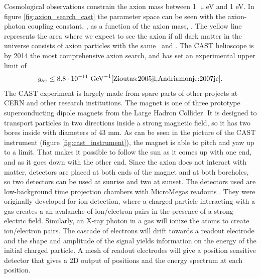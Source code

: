 Cosmological observations constrain the axion mass between 1 $\upmu$eV and 1 eV. In figure \ref{fig:axion_search_cast} the parameter space can be seen with the axion-photon coupling constant, \gay, as a function of the axion mass, \maxion. The yellow line represents the area where we expect to see the axion if all dark matter in the universe consists of axion particles with the same \maxion\ and \gay. The CAST helioscope is by 2014 the most comprehensive axion search, and has set an experimental upper limit of
\begin{eqnarray}
g_{\textrm{a$\gamma$}} \leq 8.8 \cdot 10^{-11} \textrm{ GeV}^{-1}\cite{Zioutas:2005jl,Andriamonje:2007jc}.
\end{eqnarray}
The CAST experiment is largely made from spare parts of other projects at CERN and other research institutions. The magnet is one of three prototype superconducting dipole magnets from the Large Hadron Collider. It is designed to transport particles in two directions inside a strong magnetic field, so it has two bores inside with diameters of 43 mm. As can be seen in the picture of the CAST instrument (figure \ref{fig:cast_instrument}), the magnet is able to pitch and yaw up to a limit. That makes it possible to follow the sun as it comes up with one end, and as it goes down with the other end. Since the axion does not interact with matter, detectors are placed at both ends of the magnet and at both boreholes, so two detectors can be used at sunrise and two at sunset. The detectors used are low-background time projection chambers with MicroMegas readouts \cite{Giomataris:1996eo,Giomataris:2006fy,Andriamonje:2010jh}. They were originally developed for ion detection, where a charged particle interacting with a gas creates a an avalanche of ion/electron pairs in the presence of a strong electric field. Similarly, an X-ray photon in a gas will ionize the atoms to create ion/electron pairs. The cascade of electrons will drift towards a readout electrode and the shape and amplitude of the signal yields information on the energy of the initial charged particle. A mesh of readout electrodes will give a position sensitive detector that gives a 2D output of positions and the energy spectrum at each position.


